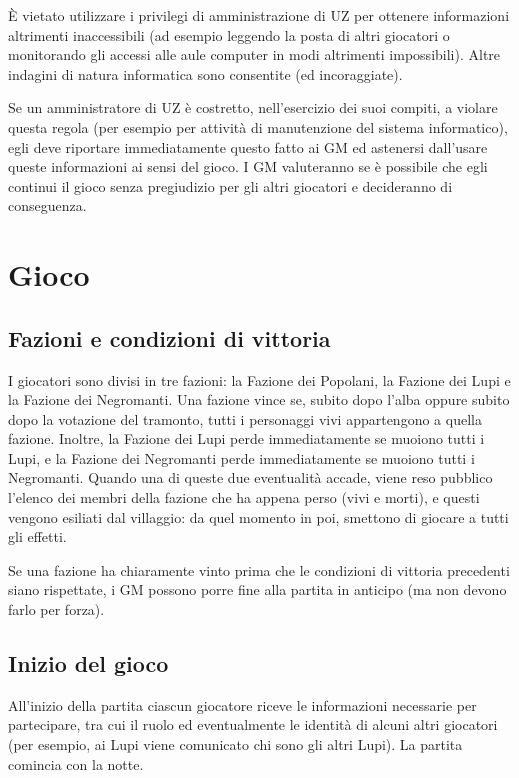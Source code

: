 \documentclass[a4paper,10pt]{article}
\begin{document}
È vietato utilizzare i privilegi di amministrazione di UZ per ottenere informazioni altrimenti inaccessibili (ad esempio leggendo la posta di altri giocatori o monitorando gli accessi alle aule computer in modi altrimenti impossibili). Altre indagini di natura informatica sono consentite (ed incoraggiate).

Se un amministratore di UZ è costretto, nell'esercizio dei suoi compiti, a violare questa regola (per esempio per attività di manutenzione del sistema informatico), egli deve riportare immediatamente questo fatto ai GM ed astenersi dall'usare queste informazioni ai sensi del gioco. I GM valuteranno se è possibile che egli continui il gioco senza pregiudizio per gli altri giocatori e decideranno di conseguenza.


\pagebreak
\section{Gioco}

\subsection{Fazioni e condizioni di vittoria}

I giocatori sono divisi in tre fazioni: la Fazione dei Popolani, la Fazione dei Lupi e la Fazione dei Negromanti. Una fazione vince se, subito dopo l'alba oppure subito dopo la votazione del tramonto, tutti i personaggi vivi appartengono a quella fazione. Inoltre, la Fazione dei Lupi perde immediatamente se muoiono tutti i Lupi, e la Fazione dei Negromanti perde immediatamente se muoiono tutti i Negromanti. Quando una di queste due eventualità accade, viene reso pubblico l'elenco dei membri della fazione che ha appena perso (vivi e morti), e questi vengono esiliati dal villaggio: da quel momento in poi, smettono di giocare a tutti gli effetti.

Se una fazione ha chiaramente vinto prima che le condizioni di vittoria precedenti siano rispettate, i GM possono porre fine alla partita in anticipo (ma non devono farlo per forza).

\subsection{Inizio del gioco}

All'inizio della partita ciascun giocatore riceve le informazioni necessarie per partecipare, tra cui il ruolo ed eventualmente le identità di alcuni altri giocatori (per esempio, ai Lupi viene comunicato chi sono gli altri Lupi). La partita comincia con la notte.
\end{document}
